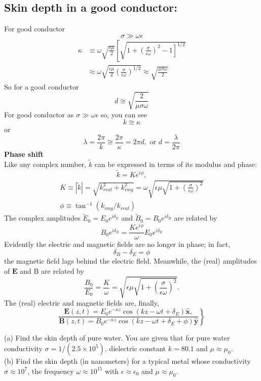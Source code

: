 \subsection{ Skin depth in a good conductor:}
For good conductor
$$
\sigma \gg \omega \epsilon
$$
$$
\begin{aligned}
\kappa & \equiv \omega \sqrt{\frac{\epsilon \mu}{2}}\left[\sqrt{\left.1+\left(\frac{\sigma}{\epsilon \omega}\right)^{2}-1\right]^{1 / 2}}\right.\\
& \approx \omega \sqrt{\frac{\epsilon \mu}{2}\left(\frac{\sigma}{\epsilon \omega}\right)^{1 / 2}} \approx \sqrt{\frac{\mu \sigma \omega}{2}}
\end{aligned}
$$
So for a good conductor
$$
d \cong \sqrt{\frac{2}{\mu \sigma \omega}}
$$
For good conductor as $\sigma \gg \omega \epsilon$ so, you can see
$$
k \cong \kappa
$$
or
$$
\lambda=\frac{2 \pi}{k} \cong \frac{2 \pi}{\kappa}=2 \pi d, \text { or } d=\frac{\lambda}{2 \pi}
$$
\textbf{Phase shift}\\
Like any complex number, $\tilde{k}$ can be expressed in terms of its modulus and phase:
$$
\tilde{k}=K e^{i \phi},
$$
$$\begin{gathered}
K \equiv|\tilde{k}|=\sqrt{k_{real}^{2}+k_{img}^{2}}=\omega \sqrt{\epsilon \mu \sqrt{1+\left(\frac{\sigma}{\epsilon \omega}\right)^{2}}} \\
\phi \equiv \tan ^{-1}(k_{img} / k_{real})
\end{gathered}$$
 The complex amplitudes $\tilde{E}_{0}=E_{0} e^{i \delta_{E}}$ and $\tilde{B}_{0}=B_{0} e^{i \delta_{B}}$ are related by
$$
B_{0} e^{i \delta_{B}}=\frac{K e^{i \phi}}{\omega} E_{0} e^{i \delta_{E}}
$$
Evidently the electric and magnetic fields are no longer in phase; in fact,
$$
\delta_{B}-\delta_{E}=\phi
$$
the magnetic field lags behind the electric fleld. Meanwhile, the (real) amplitudes of $\mathbf{E}$ and B are related by
$$
\frac{B_{0}}{E_{0}}=\frac{K}{\omega}=\sqrt{\epsilon \mu \sqrt{1+\left(\frac{\sigma}{\epsilon \omega}\right)^{2}}} .
$$
The (real) electric and magnetic fields are, finally,
$$
\left.\frac{\mathbf{E}(z, t)=E_{0} e^{-\kappa z} \cos \left(k z-\omega t+\delta_{E}\right) \hat{\mathbf{x}},}{\mathbf{B}(z, t)=B_{0} e^{-\kappa z} \cos \left(k z-\omega t+\delta_{E}+\phi\right) \hat{\mathbf{y}}}\right\}$$
\begin{exercise}
 (a) Find the skin depth of pure water. You are given that for pure water conductivity $\sigma=1 /\left(2.5 \times 10^{5}\right)$, dielectric constant $k=80.1$ and $\mu \approx \mu_{0}$.\\
 (b) Find the skin depth (in nanometers) for a typical metal whose conductivity $\sigma \approx 10^{7}$, the frequency $\omega \approx 10^{15}$ with $\epsilon \approx \epsilon_{0}$ and $\mu \approx \mu_{0}$.
\end{exercise}

